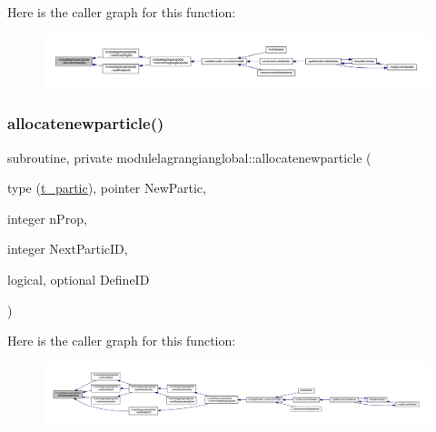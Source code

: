 Here is the caller graph for this function\+:\nopagebreak
\begin{figure}[H]
\begin{center}
\leavevmode
\includegraphics[width=350pt]{namespacemodulelagrangianglobal_a537c7269309c583343ae41dfe244a2b0_icgraph}
\end{center}
\end{figure}
\mbox{\label{namespacemodulelagrangianglobal_adf7a8f7c3f2d3dd4f0472f6d4d1ec56e}} 
\subsubsection{\texorpdfstring{allocatenewparticle()}{allocatenewparticle()}}
{\footnotesize\ttfamily subroutine, private modulelagrangianglobal\+::allocatenewparticle (\begin{DoxyParamCaption}\item[{type (\mbox{\hyperlink{structmodulelagrangianglobal_1_1t__partic}{t\+\_\+partic}}), pointer}]{New\+Partic,  }\item[{integer}]{n\+Prop,  }\item[{integer}]{Next\+Partic\+ID,  }\item[{logical, optional}]{Define\+ID }\end{DoxyParamCaption})\hspace{0.3cm}{\ttfamily [private]}}

Here is the caller graph for this function\+:\nopagebreak
\begin{figure}[H]
\begin{center}
\leavevmode
\includegraphics[width=350pt]{namespacemodulelagrangianglobal_adf7a8f7c3f2d3dd4f0472f6d4d1ec56e_icgraph}
\end{center}
\end{figure}
\mbox{\label{namespacemodulelagrangianglobal_aa537bff97afb419645e62f2b096b2e56}} 
